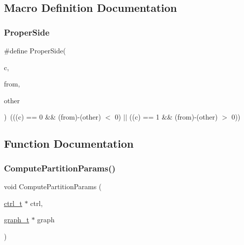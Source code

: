 \subsection{Macro Definition Documentation}
\mbox{\label{a00918_a0fc4274c04fd700ac3a3594ef91e15c7}} 
\subsubsection{\texorpdfstring{Proper\+Side}{ProperSide}}
{\footnotesize\ttfamily \#define Proper\+Side(\begin{DoxyParamCaption}\item[{}]{c,  }\item[{}]{from,  }\item[{}]{other }\end{DoxyParamCaption})~(((c) == 0 \&\& (from)-\/(other) $<$ 0) $\vert$$\vert$ ((c) == 1 \&\& (from)-\/(other) $>$ 0))}



\subsection{Function Documentation}
\mbox{\label{a00918_a2fdeee823a8743e900301c088677bdf3}} 
\subsubsection{\texorpdfstring{Compute\+Partition\+Params()}{ComputePartitionParams()}}
{\footnotesize\ttfamily void Compute\+Partition\+Params (\begin{DoxyParamCaption}\item[{\hyperlink{a00742}{ctrl\+\_\+t} $\ast$}]{ctrl,  }\item[{\hyperlink{a00734}{graph\+\_\+t} $\ast$}]{graph }\end{DoxyParamCaption})}

